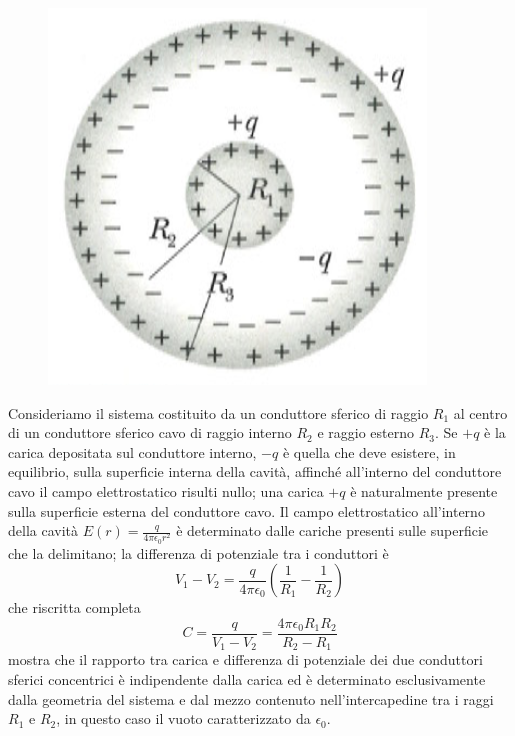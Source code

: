 \documentclass[class=book, crop=false, oneside, 12pt]{standalone}
\begin{document}
\begin{figure}[h]
    \includegraphics[scale=0.4]{condensatore_sferico.png}
    \centering
    \caption{}
\end{figure}

Consideriamo il sistema costituito da un conduttore sferico di raggio \(R_1\) al centro di un conduttore sferico cavo di raggio interno \(R_2\) e raggio esterno \(R_3\).
Se \(+q\) è la carica depositata sul conduttore interno, \(-q\) è quella che deve esistere, in equilibrio, sulla superficie interna della cavità, affinché all'interno del conduttore cavo il campo elettrostatico risulti nullo; una carica \(+q\) è naturalmente presente sulla superficie esterna del conduttore cavo. 
Il campo elettrostatico all'interno della cavità \(E(r) = \frac{q}{4 \pi \epsilon_0 r^2}\) è  determinato dalle cariche presenti sulle superficie che la delimitano; la differenza di potenziale tra i conduttori è 
\begin{equation*}
    V_1 - V_2 = \frac{q}{4 \pi \epsilon_0} \left(\frac{1}{R_1} - \frac{1}{R_2}\right)
\end{equation*}
che riscritta completa
\begin{equation}
    C = \frac{q}{V_1 - V_2} = \frac{4 \pi \epsilon_0 R_1 R_2}{R_2 - R_1}
\end{equation}
mostra che il rapporto tra carica e differenza di potenziale dei due conduttori sferici concentrici è indipendente dalla carica ed è determinato esclusivamente dalla geometria del sistema e dal mezzo contenuto nell'intercapedine tra i raggi \(R_1\) e \(R_2\), in questo caso il vuoto caratterizzato da \(\epsilon_0\).
\end{document}
